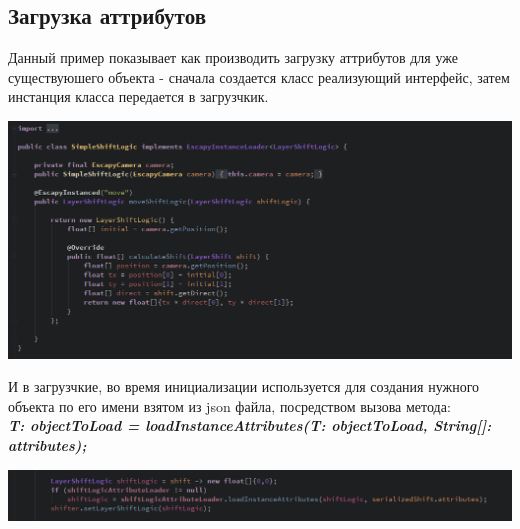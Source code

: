 \documentclass[11pt]{report}
\begin{document}
\subsection{Загрузка аттрибутов}
Данный пример показывает как производить загрузку аттрибутов для уже существуюшего объекта - сначала создается класс реализующий интерфейс, затем инстанция класса передается в загрузчкик.
\begin{center}
	\includegraphics[width=1.2\linewidth]{img/7.png} 
  	\label{img:7} 
\end{center}
И в загрузчкие, во время инициализации используется для создания нужного объекта по его имени взятом из json файла, посредством вызова метода:\\ \textit{\textbf{T: objectToLoad = loadInstanceAttributes(T: objectToLoad, String[]: attributes);}}
\begin{center}
	\includegraphics[width=1.2\linewidth]{img/8.png} 
  	\label{img:8} 
\end{center}
\end{document}

